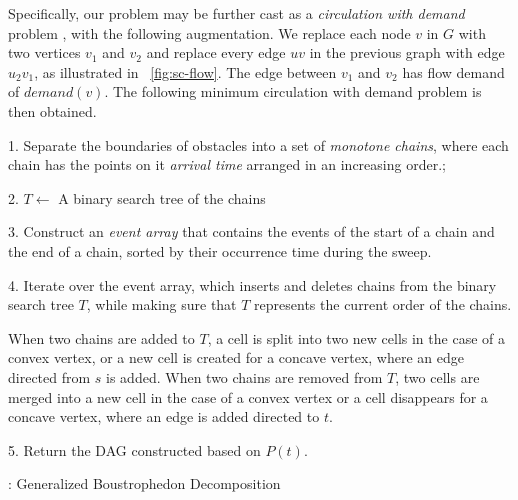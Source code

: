 Specifically, our problem may be further cast as a \emph{circulation with demand} 
problem \cite{kleinberg2006algorithm}, with the following augmentation. We replace 
each node $v$ in $G$ with two vertices $v_1$ and $v_2$ and replace every edge 
$uv$ in the previous graph with edge $u_2 v_1$, as illustrated in ~\ref{fig:sc-flow}. 
The edge between $v_1$ and $v_2$ has flow demand of $demand(v)$. 
The following minimum circulation with demand problem is then obtained.

\begin{algorithm}[h!]
\vspace{1mm}
\DontPrintSemicolon
{}

1. Separate the boundaries of obstacles into a set of \emph{monotone chains},
where each chain has the points on it \emph{arrival time} arranged in an 
increasing order.;\;
\vspace{0.5mm}

2. $T\gets$ A binary search  tree of the chains\;
\vspace{0.5mm}

3. Construct an \emph{event array} that contains the events of the start of a chain and the end of a chain, sorted by their occurrence time during the sweep.\;
\vspace{0.5mm}

4. Iterate over the event array, which inserts and deletes chains from the binary search tree $T$, while making sure that $T$ represents the current order of the chains.\;
\vspace{0.5mm}

When two chains are added to $T$, a cell is split into two new cells in the case of a convex vertex, or a new cell is created for a concave vertex, where an edge directed from $s$ is added.\;
When two chains are removed from $T$, two cells are merged into a new cell in the case of a convex vertex or a cell disappears for a concave vertex, where an edge is added directed to $t$.\;

5. Return the DAG constructed based on $P(t)$.
\caption{\protect{}: Generalized Boustrophedon Decomposition} 
\label{alg:genbou}
\end{algorithm}


